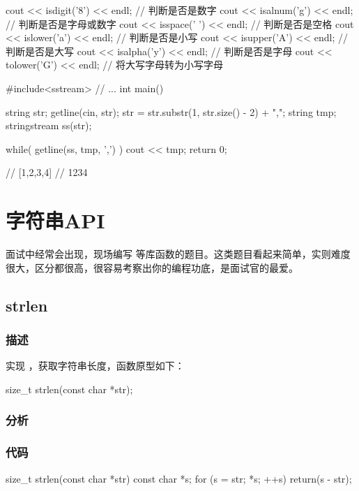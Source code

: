\begin{NoteCode}
cout << isdigit('8') << endl; // 判断是否是数字
cout << isalnum('g') << endl; // 判断是否是字母或数字
cout << isspace(' ') << endl; // 判断是否是空格
cout << islower('a') << endl; // 判断是否是小写
cout << isupper('A') << endl; // 判断是否是大写
cout << isalpha('y') << endl; // 判断是否是字母
cout << tolower('G') << endl; // 将大写字母转为小写字母
\end{NoteCode}

\Note{[1,2,3,4]}
\begin{NoteCode}
#include<sstream>
// ... 
int main(){
    string str;
    getline(cin, str);
    str = str.substr(1, str.size() - 2) + ",";
    string tmp;
    stringstream ss(str);

    while( getline(ss, tmp, ',') ) cout << tmp;
    return 0;
}
// [1,2,3,4]
// 1234 
\end{NoteCode}




\section{字符串API} %
面试中经常会出现，现场编写  等库函数的题目。这类题目看起来简单，实则难度很大，区分都很高，很容易考察出你的编程功底，是面试官的最爱。


\subsection{strlen}


\subsubsection{描述}
实现 ，获取字符串长度，函数原型如下：
\begin{Code}
size_t strlen(const char *str);
\end{Code}


\subsubsection{分析}



\subsubsection{代码}
\begin{Code}
size_t strlen(const char *str) {
    const char *s;
    for (s = str; *s; ++s) {}
    return(s - str);
}
\end{Code}

